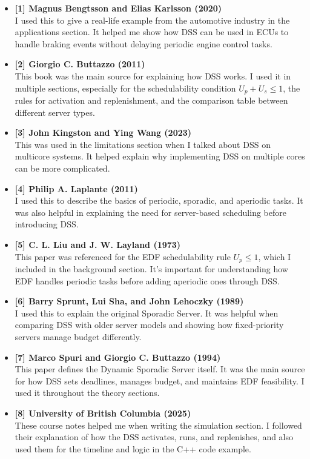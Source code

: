\documentclass[conference]{IEEEtran}
\begin{document}
\begin{itemize}
    \item \textbf{[1] Magnus Bengtsson and Elias Karlsson (2020)}\\
    I used this to give a real-life example from the automotive industry in the applications section. It helped me show how DSS can be used in ECUs to handle braking events without delaying periodic engine control tasks.

    \item \textbf{[2] Giorgio C. Buttazzo (2011)}\\
    This book was the main source for explaining how DSS works. I used it in multiple sections, especially for the schedulability condition \( U_p + U_s \leq 1 \), the rules for activation and replenishment, and the comparison table between different server types.

    \item \textbf{[3] John Kingston and Ying Wang (2023)}\\
    This was used in the limitations section when I talked about DSS on multicore systems. It helped explain why implementing DSS on multiple cores can be more complicated.

    \item \textbf{[4] Philip A. Laplante (2011)}\\
    I used this to describe the basics of periodic, sporadic, and aperiodic tasks. It was also helpful in explaining the need for server-based scheduling before introducing DSS.

    \item \textbf{[5] C. L. Liu and J. W. Layland (1973)}\\
    This paper was referenced for the EDF schedulability rule \( U_p \leq 1 \), which I included in the background section. It’s important for understanding how EDF handles periodic tasks before adding aperiodic ones through DSS.

    \item \textbf{[6] Barry Sprunt, Lui Sha, and John Lehoczky (1989)}\\
    I used this to explain the original Sporadic Server. It was helpful when comparing DSS with older server models and showing how fixed-priority servers manage budget differently.

    \item \textbf{[7] Marco Spuri and Giorgio C. Buttazzo (1994)}\\
    This paper defines the Dynamic Sporadic Server itself. It was the main source for how DSS sets deadlines, manages budget, and maintains EDF feasibility. I used it throughout the theory sections.

    \item \textbf{[8] University of British Columbia (2025)}\\
    These course notes helped me when writing the simulation section. I followed their explanation of how the DSS activates, runs, and replenishes, and also used them for the timeline and logic in the C++ code example.
\end{itemize}




\printbibliography


\vspace{12pt}
\color{red}
\end{document}
